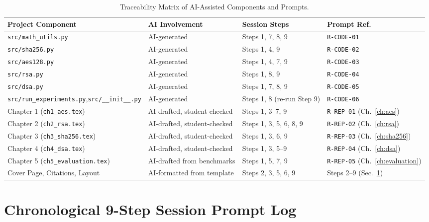 \begin{table}[H]
\centering
\caption{Traceability Matrix of AI-Assisted Components and Prompts.}
\label{tab:ai_traceability}
\footnotesize
\begin{tabularx}{\linewidth}{>{\raggedright\arraybackslash}p{4.3cm}>{\raggedright\arraybackslash}X>{\raggedright\arraybackslash}X>{\raggedright\arraybackslash}X}
\toprule
\textbf{Project Component} & \textbf{AI Involvement} & \textbf{Session Steps} & \textbf{Prompt Ref.} \\
\midrule
\texttt{src/math\_utils.py} & AI-generated & Steps 1, 7, 8, 9 & \texttt{R-CODE-01} \\
\texttt{src/sha256.py} & AI-generated & Steps 1, 4, 9 & \texttt{R-CODE-02} \\
\texttt{src/aes128.py} & AI-generated & Steps 1, 4, 7, 9 & \texttt{R-CODE-03} \\
\texttt{src/rsa.py} & AI-generated & Steps 1, 8, 9 & \texttt{R-CODE-04} \\
\texttt{src/dsa.py} & AI-generated & Steps 1, 7, 8, 9 & \texttt{R-CODE-05} \\
\texttt{src/run\_experiments.py},\newline\texttt{src/\_\_init\_\_.py} & AI-generated & Steps 1, 8 (re-run Step 9) & \texttt{R-CODE-06} \\
Chapter 1 (\texttt{ch1\_aes.tex}) & AI-drafted, student-checked & Steps 1, 3--7, 9 & \texttt{R-REP-01} (Ch.~\ref{ch:aes}) \\
Chapter 2 (\texttt{ch2\_rsa.tex}) & AI-drafted, student-checked & Steps 1, 3, 5, 6, 8, 9 & \texttt{R-REP-02} (Ch.~\ref{ch:rsa}) \\
Chapter 3 (\texttt{ch3\_sha256.tex}) & AI-drafted, student-checked & Steps 1, 3, 6, 9 & \texttt{R-REP-03} (Ch.~\ref{ch:sha256}) \\
Chapter 4 (\texttt{ch4\_dsa.tex}) & AI-drafted, student-checked & Steps 1, 3, 5--9 & \texttt{R-REP-04} (Ch.~\ref{ch:dsa}) \\
Chapter 5 (\texttt{ch5\_evaluation.tex}) & AI-drafted from benchmarks & Steps 1, 5, 7, 9 & \texttt{R-REP-05} (Ch.~\ref{ch:evaluation}) \\
Cover Page, Citations, Layout & AI-formatted from template & Steps 2, 3, 5, 6, 9 & Steps 2--9 (Sec.~\ref{sec:app_session_log}) \\
\bottomrule
\end{tabularx}
\end{table}

\section{Chronological 9-Step Session Prompt Log}
\label{sec:app_session_log}

